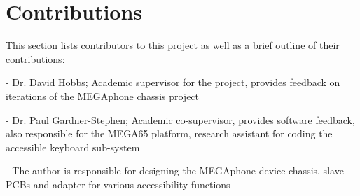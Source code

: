 
\section{Contributions}

This section lists contributors to this project as well as a brief outline of their contributions:

-   Dr. David Hobbs; Academic supervisor for the project, provides feedback on iterations of the MEGAphone chassis project

-   Dr. Paul Gardner-Stephen; Academic co-supervisor, provides software feedback, also responsible for the MEGA65 platform, research assistant for coding the accessible keyboard sub-system %

-   The author is responsible for designing the MEGAphone device chassis, slave PCBs and adapter for various accessibility functions
